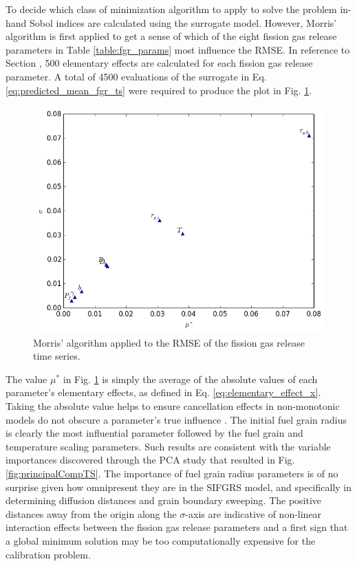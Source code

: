 To decide which class of minimization algorithm to apply to solve the problem in-hand Sobol indices are calculated using the surrogate model. However, Morris' algorithm is first applied to get a sense of which of the eight fission gas release parameters in Table \ref{table:fgr_params} most influence the \ac{RMSE}. In reference to Section \cite{subsec:morris_algorithm}, 500 elementary effects are calculated for each fission gas release parameter. A total of 4500 evaluations of the surrogate in Eq. \ref{eq:predicted_mean_fgr_ts} were required to produce the plot in Fig. \ref{fig:fgr_morris_plot}.
\begin{figure}[!h]
\caption{\label{fig:fgr_morris_plot}
Morris' algorithm applied to the \ac{RMSE} of the fission gas release time series.}
 \begin{center}
  \includegraphics[scale=.75]{./Chapter4/fgr_morris.png}
 \end{center}
\end{figure}
The value $\mu^*$ in Fig. \ref{fig:fgr_morris_plot} is simply the average of the absolute values of each parameter's elementary effects, as defined in Eq. \ref{eq:elementary_effect_x}. Taking the absolute value helps to ensure cancellation effects in non-monotonic models do not obscure a parameter's true influence \cite{Morris}. The initial fuel grain radius is clearly the most influential parameter followed by the fuel grain and temperature scaling parameters. Such results are consistent with the variable importances discovered through the \ac{PCA} study that resulted in Fig. \ref{fig:principalCompTS}. The importance of fuel grain radius parameters is of no surprise given how omnipresent they are in the \ac{SIFGRS} model, and specifically in determining diffusion distances and grain boundary sweeping. The positive distances away from the origin along the $\sigma$-axis are indicative of non-linear interaction effects between the fission gas release parameters and a first sign that a global minimum solution may be too computationally expensive for the calibration problem.  

